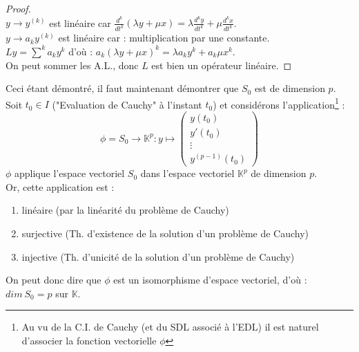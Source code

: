 \documentclass[11pt, a4paper, openany]{book}
\begin{document}
\begin{proof}\ \\
	$y \rightarrow y^{(k)}$ est linéaire car $\frac{d^k}{dt^k}(\lambda y + \mu x) = \lambda\frac{d^k y}{dt^k} + \mu \frac{d^kx}{dt^k}$.\\
	$y \rightarrow a_ky^{(k)}$ est linéaire car : multiplication par une constante.\\
	$Ly = \sum^k a_k y^k$ d'où : $a_k(\lambda y + \mu x)^k = \lambda a_k y^k + a_k \mu x^k$.\\
	On peut sommer les A.L., donc $L$ est bien un opérateur linéaire.
\end{proof}
		
Ceci étant démontré, il faut maintenant démontrer que $S_0$ est de dimension $p$. Soit $t_0 \in I$ ("Evaluation de Cauchy" à l'instant $t_0$) et considérons l'application\footnote{Au vu de la C.I. de Cauchy (et du SDL associé à l'EDL) il est naturel d'associer la fonction vectorielle $\phi$} :
\begin{equation}
	\phi = S_0 \rightarrow \mathbb{K}^p : y \mapsto \left( \begin{array}{c}
	y(t_0)\\
	y'(t_0) \\
	\vdots \\
	y^{(p-1)}(t_0)
	\end{array} \right)
\end{equation}
$\phi$ applique l'espace vectoriel $S_0$ dans l'espace vectoriel $\mathbb{K}^p$ de dimension $p$.\\
Or, cette application est : 
\begin{enumerate}
	\item linéaire (par la linéarité du problème de Cauchy)
	\item surjective (Th. d'existence de la solution d'un problème de Cauchy)
	\item injective (Th. d'unicité de la solution d'un problème de Cauchy)
\end{enumerate}
On peut donc dire que $\phi$ est un isomorphisme d'espace vectoriel, d'où : $dim\ S_0 = p$ sur $\mathbb{K}$.
		
\end{document}
